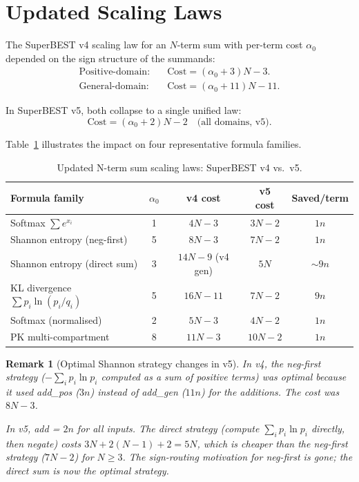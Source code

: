 \documentclass[12pt,a4paper]{article}
\newtheorem{remark}[theorem]{Remark}
\theoremstyle{definition}
\newcommand{\Cost}{\mathrm{Cost}}
\begin{document}
\section{Updated Scaling Laws}
\label{sec:scaling}

The SuperBEST v4 scaling law for an $N$-term sum with per-term cost $\alpha_0$
depended on the sign structure of the summands:
\begin{align*}
  \text{Positive-domain:} &\quad \Cost = (\alpha_0 + 3)N - 3. \\
  \text{General-domain:}  &\quad \Cost = (\alpha_0 + 11)N - 11.
\end{align*}

In SuperBEST v5, both collapse to a single unified law:
\[
  \boxed{\Cost = (\alpha_0 + 2)N - 2 \quad \text{(all domains, v5).}}
\]

Table~\ref{tab:scaling} illustrates the impact on four representative formula
families.

\begin{table}[h]
\centering
\caption{Updated N-term sum scaling laws: SuperBEST v4 vs.\ v5.}
\label{tab:scaling}
\smallskip
\begin{tabular}{@{}lcccc@{}}
\toprule
\textbf{Formula family} & $\alpha_0$ & \textbf{v4 cost} & \textbf{v5 cost} & \textbf{Saved/term} \\
\midrule
Softmax $\sum e^{x_i}$            & 1 & $4N - 3$ & $3N - 2$  & $1n$ \\
Shannon entropy (neg-first)       & 5 & $8N - 3$ & $7N - 2$  & $1n$ \\
Shannon entropy (direct sum)      & 3 & $14N-9$ (v4 gen) & $5N$    & $\sim 9n$ \\
KL divergence $\sum p_i\ln(p_i/q_i)$ & 5 & $16N-11$ & $7N - 2$ & $9n$ \\
Softmax (normalised)              & 2 & $5N - 3$ & $4N - 2$  & $1n$ \\
PK multi-compartment              & 8 & $11N-3$  & $10N - 2$ & $1n$ \\
\bottomrule
\end{tabular}
\end{table}

\begin{remark}[Optimal Shannon strategy changes in v5]
In v4, the neg-first strategy ($-\sum_i p_i \ln p_i$ computed as a sum of
positive terms) was optimal because it used add\_pos ($3n$) instead of
add\_gen ($11n$) for the additions.  The cost was $8N - 3$.

In v5, add = $2n$ for all inputs.  The direct strategy (compute $\sum_i p_i \ln p_i$
directly, then negate) costs $3N + 2(N-1) + 2 = 5N$, which is cheaper than
the neg-first strategy ($7N - 2$) for $N \geq 3$.  The sign-routing motivation
for neg-first is gone; the direct sum is now the optimal strategy.
\end{remark}
\end{document}
